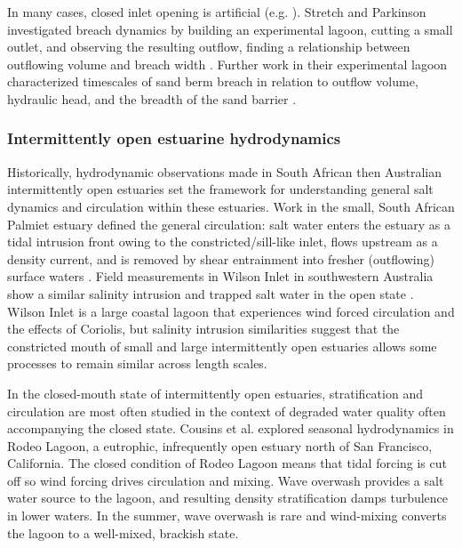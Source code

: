 In many cases, closed inlet opening is artificial (e.g. \cite{fortunato_morphological_2014, behrens_episodic_2013}). Stretch and Parkinson investigated breach dynamics by building an experimental lagoon, cutting a small outlet, and observing the resulting outflow, finding a relationship between outflowing volume and breach width \parencite*{stretch_breaching_2006}. Further work in their experimental lagoon characterized timescales of sand berm breach in relation to outflow volume, hydraulic head, and the breadth of the sand barrier \parencite{parkinson_breaching_2007}. 


\subsubsection{Intermittently open estuarine hydrodynamics}

Historically, hydrodynamic observations made in South African then Australian intermittently open estuaries set the framework for understanding general salt dynamics and circulation within these estuaries. Work in the small, South African Palmiet estuary defined the general circulation: salt water enters the estuary as a tidal intrusion front owing to the constricted/sill-like inlet, flows upstream as a density current, and is removed by shear entrainment into fresher (outflowing) surface waters \parencite{largier_stratified_1992}. Field measurements in Wilson Inlet in southwestern Australia show a similar salinity intrusion and trapped salt water in the open state \parencite{ranasinghe_circulation_1999}. Wilson Inlet is a large coastal lagoon that experiences wind forced circulation and the effects of Coriolis, but salinity intrusion similarities suggest that the constricted mouth of small and large intermittently open estuaries allows some processes to remain similar across length scales. 


In the closed-mouth state of intermittently open estuaries, stratification and circulation are most often studied in the context of degraded water quality often accompanying the closed state. Cousins et al. \parencite*{cousins_effects_2010} explored seasonal hydrodynamics in Rodeo Lagoon, a eutrophic, infrequently open estuary north of San Francisco, California. The closed condition of Rodeo Lagoon means that tidal forcing is cut off so wind forcing drives circulation and mixing. Wave overwash provides a salt water source to the lagoon, and resulting density stratification damps turbulence in lower waters. In the summer, wave overwash is rare and wind-mixing converts the lagoon to a well-mixed, brackish state.

